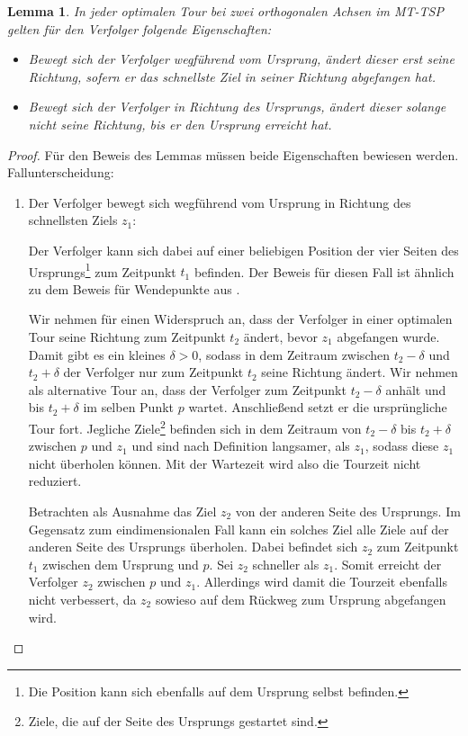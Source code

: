\documentclass[german,version-2019-11]{uzl-thesis}
\newtheorem{lem}{Lemma}
\begin{document}
\begin{lem}
\label{lem:2}
In jeder optimalen Tour bei zwei orthogonalen Achsen im MT-TSP gelten für den Verfolger folgende Eigenschaften:
\begin{itemize}
\item
Bewegt sich der Verfolger wegführend vom Ursprung, ändert dieser erst seine Richtung, sofern er das schnellste Ziel in seiner Richtung abgefangen hat.
\item
Bewegt sich der Verfolger in Richtung des Ursprungs, ändert dieser solange nicht seine Richtung, bis er den Ursprung erreicht hat.
\end{itemize}
\end{lem}

\begin{proof}
Für den Beweis des Lemmas müssen beide Eigenschaften bewiesen werden. Fallunterscheidung:
\begin{enumerate}
\item 
Der Verfolger bewegt sich wegführend vom Ursprung in Richtung des schnellsten Ziels $z_1$: 

Der Verfolger kann sich dabei auf einer beliebigen Position der vier Seiten des Ursprungs\footnote{Die Position kann sich ebenfalls auf dem Ursprung selbst befinden.} zum Zeitpunkt $t_1$ befinden. Der Beweis für diesen Fall ist ähnlich zu dem Beweis für Wendepunkte aus \cite{helvig}.

Wir nehmen für einen Widerspruch an, dass der Verfolger in einer optimalen Tour seine Richtung zum Zeitpunkt $t_2$ ändert, bevor $z_1$ abgefangen wurde. Damit gibt es ein kleines $\delta>0$, sodass in dem Zeitraum zwischen $t_2-\delta$ und $t_2+\delta$ der Verfolger nur zum Zeitpunkt $t_2$ seine Richtung ändert. Wir nehmen als alternative Tour an, dass der Verfolger zum Zeitpunkt $t_2-\delta$ anhält und bis $t_2+\delta$ im selben Punkt $p$ wartet. Anschließend setzt er die ursprüngliche Tour fort. Jegliche Ziele\footnote{Ziele, die auf der Seite des Ursprungs gestartet sind.} befinden sich in dem Zeitraum von $t_2-\delta$ bis $t_2+\delta$ zwischen $p$ und $z_1$ und sind nach Definition langsamer, als $z_1$, sodass diese $z_1$ nicht überholen können. Mit der Wartezeit wird also die Tourzeit nicht reduziert.

Betrachten als Ausnahme das Ziel $z_2$ von der anderen Seite des Ursprungs. Im Gegensatz zum eindimensionalen Fall kann ein solches Ziel alle Ziele auf der anderen Seite des Ursprungs überholen. Dabei befindet sich  $z_2$ zum Zeitpunkt $t_1$ zwischen dem Ursprung und $p$. Sei $z_2$ schneller als $z_1$. Somit erreicht der Verfolger $z_2$ zwischen $p$ und $z_1$. Allerdings wird damit die Tourzeit ebenfalls nicht verbessert, da $z_2$ sowieso auf dem Rückweg zum Ursprung abgefangen wird. 


\end{enumerate}
\end{proof}
\end{document}
